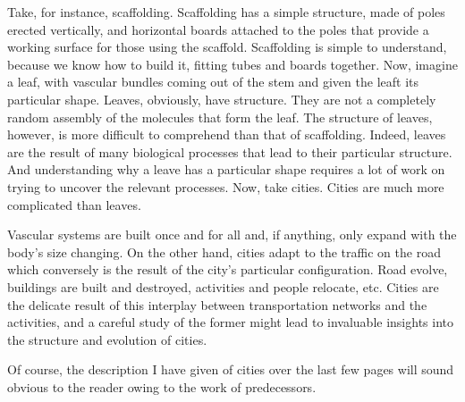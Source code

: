 Take, for instance, scaffolding. Scaffolding has a simple structure, made of
poles erected vertically, and horizontal boards attached to the poles that provide a
working surface for those using the scaffold. Scaffolding is simple to
understand, because we know how to build it, fitting tubes and boards together.
Now, imagine a leaf, with vascular bundles coming out of the stem and given the
leaft its particular shape. Leaves, obviously, have structure. They are not a
completely random assembly of the molecules that form the leaf. The structure of
leaves, however, is more difficult to comprehend than that of scaffolding.
Indeed, leaves are the result of many biological processes that lead to their
particular structure. And understanding why a leave has a particular shape
requires a lot of work on trying to uncover the relevant processes. 
Now, take cities. Cities are much more complicated than leaves.


Vascular systems are built once and for all and, if anything, only expand with
the body's size changing. On the other hand, cities adapt to the traffic on the
road which conversely is the result of the city's particular configuration.
Road evolve, buildings are built and destroyed, activities and people relocate,
etc. Cities are the delicate result of this interplay between transportation
networks and the activities, and a careful study of the former might lead to
invaluable insights into the structure and evolution of cities.

Of course, the description I have given of cities over the last few pages will
sound obvious to the reader owing to the work of predecessors.
